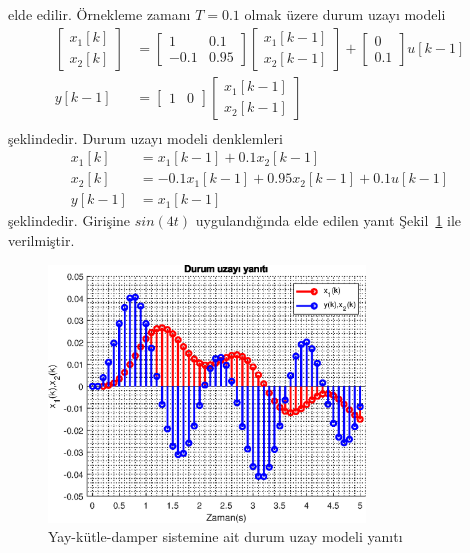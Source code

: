 elde edilir. Örnekleme zamanı $T=0.1$ olmak üzere durum uzayı modeli
\begin{equation}
    \begin{split}
\begin{bmatrix}
    x_1[k]\\
    x_2[k]
\end{bmatrix}&=
\begin{bmatrix}
    1& 0.1\\
    -0.1& 0.95
\end{bmatrix}\begin{bmatrix}
    x_1[k-1]\\
    x_2[k-1]
\end{bmatrix}+\begin{bmatrix}
    0\\
    0.1
\end{bmatrix}u[k-1]\\
y[k-1]&=\begin{bmatrix}
    1&0 
\end{bmatrix}\begin{bmatrix}
    x_1[k-1]\\
    x_2[k-1]
\end{bmatrix}\\
\end{split}
\end{equation}
şeklindedir. Durum uzayı modeli denklemleri
\begin{equation}
    \begin{split}
    x_1[k]&=x_1[k-1]+0.1x_2[k-1]\\
    x_2[k]&=-0.1x_1[k-1]+0.95x_2[k-1]+0.1u[k-1]\\
    y[k-1]&=x_1[k-1]
\end{split}
\end{equation}
şeklindedir. Girişine $sin(4t)$ uygulandığında elde edilen yanıt Şekil~\ref{fig:lec11_plot1} ile verilmiştir.
\begin{figure}[!htb]
    \centering
    \includegraphics[width=0.75\textwidth]{img/lec11_plot1}
    \caption{Yay-kütle-damper sistemine ait durum uzay modeli yanıtı}
    \label{fig:lec11_plot1}
\end{figure}

